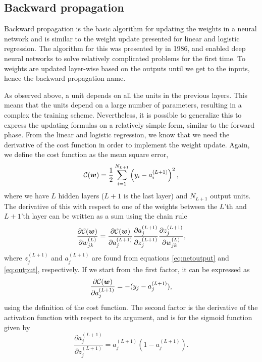 \subsection{Backward propagation} \label{sec:backward}
Backward propagation is the basic algorithm for updating the weights in a neural network and is similar to the weight update presented for linear and logistic regression. The algorithm for this was presented by \citet{rumelhart_learning_1986} in 1986, and enabled deep neural networks to solve relatively complicated problems for the first time. To weights are updated layer-wise based on the outputs until we get to the inputs, hence the backward propagation name. 

As observed above, a unit depends on all the units in the previous layers. This means that the units depend on a large number of parameters, resulting in a complex the training scheme. Nevertheless, it is possible to generalize this to express the updating formulas on a relatively simple form, similar to the forward phase. From the linear and logistic regression, we know that we need the derivative of the cost function in order to implement the weight update. Again, we define the cost function as the mean square error,
\begin{equation}
\mathcal{C}(\boldsymbol{{w}})=\frac{1}{2}\sum_{i=1}^{N_{L+1}}\left(y_i-a_i^{(L+1)}\right)^2,
\end{equation}
where we have $L$ hidden layers ($L+1$ is the last layer) and $N_{L+1}$ output units. The derivative of this with respect to one of the weights between the $L$'th and $L+1$'th layer can be written as a sum using the chain rule
\begin{equation}
\frac{\partial\mathcal{C}(\boldsymbol{{w}})}{\partial w_{jk}^{(L)}}=\frac{\partial\mathcal{C}(\boldsymbol{{w}})}{\partial a_j^{(L+1)}}\frac{\partial a_j^{(L+1)}}{\partial z_j^{(L+1)}}\frac{\partial z_j^{(L+1)}}{\partial w_{jk}^{(L)}},
\end{equation}
where $z_j^{(L+1)}$ and $a_j^{(L+1)}$ are found from equations \eqref{eq:netoutput} and \eqref{eq:output}, respectively. If we start from the first factor, it can be expressed as
\begin{equation}
\frac{\partial\mathcal{C}(\boldsymbol{{w}})}{\partial a_j^{(L+1)}}=-(y_j-a_j^{(L+1)}),
\end{equation}
using the definition of the cost function. The second factor is the derivative of the activation function with respect to its argument, and is for the sigmoid function given by
\begin{equation}
\frac{\partial a_j^{(L+1)}}{\partial z_j^{(L+1)}}=a_j^{(L+1)}(1-a_j^{(L+1)}).
\end{equation}
